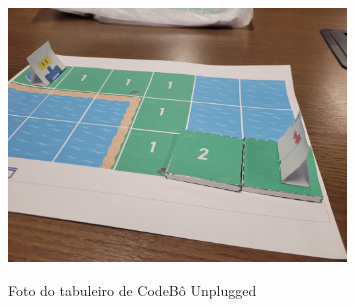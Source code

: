 \begin{figure}[H]
	\centering
	\caption{Foto do tabuleiro de CodeBô Unplugged}
	\includegraphics[width=0.8\textwidth]{images/code-unplugged.png}
	\label{fig:codebo_unplugged}
\end{figure}
